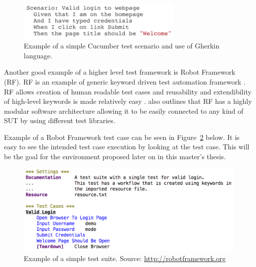 \begin{figure}[ht]
  \begin{center}
    \includegraphics[width=8cm]{images/cucumber_example.png}
    \caption{Example of a simple Cucumber test scenario and use of Gherkin language.}
    \label{fig:cucumber}
  \end{center}
\end{figure}
\FloatBarrier

Another good example of a higher level test framework is Robot Framework (RF). RF is an example of generic keyword driven test automation framework \emph{\citep{robotframework}}. RF allows creation of human readable test cases and reusability and extendibility of high-level keywords is made relatively easy \emph{\citep{stresnjak2011usage}}. \emph{\cite{Rfuserguide}} also outlines that RF has a highly modular software architecture allowing it to be easily connected to any kind of SUT by using different test libraries.

Example of a Robot Framework test case can be seen in Figure~\ref{fig:robot_example} below. It is easy to see the intended test case execution by looking at the test case. This will be the goal for the environment proposed later on in this master's thesis.

\begin{figure}[ht]
  \begin{center}
    \includegraphics[width=12cm]{images/robot_example.png}
    \caption{Example of a simple test suite. Source: \url{http://robotframework.org}}
    \label{fig:robot_example}
  \end{center}
\end{figure}
\FloatBarrier
